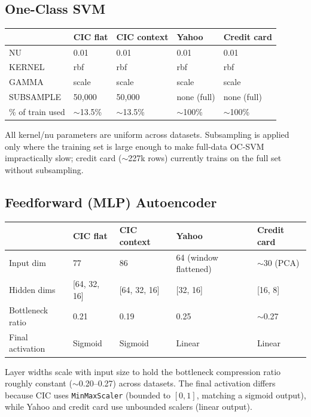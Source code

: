 \subsection{One-Class SVM}

\begin{center}
\begin{tabular}{@{}lllll@{}}
\toprule
 & CIC flat & CIC context & Yahoo & Credit card \\
\midrule
NU & 0.01 & 0.01 & 0.01 & 0.01 \\
KERNEL & rbf & rbf & rbf & rbf \\
GAMMA & scale & scale & scale & scale \\
SUBSAMPLE & 50{,}000 & 50{,}000 & none (full) & none (full) \\
\% of train used & $\sim$13.5\% & $\sim$13.5\% & $\sim$100\% & $\sim$100\% \\
\bottomrule
\end{tabular}
\end{center}

All kernel/nu parameters are uniform across datasets. Subsampling is applied only where the training set is large enough to make full-data OC-SVM impractically slow; credit card ($\sim$227k rows) currently trains on the full set without subsampling.

\subsection{Feedforward (MLP) Autoencoder}

\begin{center}
\begin{tabular}{@{}lllll@{}}
\toprule
 & CIC flat & CIC context & Yahoo & Credit card \\
\midrule
Input dim & 77 & 86 & 64 (window flattened) & $\sim$30 (PCA) \\
Hidden dims & [64, 32, 16] & [64, 32, 16] & [32, 16] & [16, 8] \\
Bottleneck ratio & 0.21 & 0.19 & 0.25 & $\sim$0.27 \\
Final activation & Sigmoid & Sigmoid & Linear & Linear \\
\bottomrule
\end{tabular}
\end{center}

Layer widths scale with input size to hold the bottleneck compression ratio roughly constant ($\sim$0.20--0.27) across datasets. The final activation differs because CIC uses \texttt{MinMaxScaler} (bounded to $[0,1]$, matching a sigmoid output), while Yahoo and credit card use unbounded scalers (linear output).

